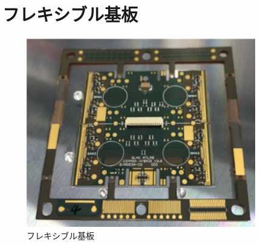\clearpage
\section{フレキシブル基板}
\begin{figure}[bpt]\centering
\includegraphics[width=10cm]{./pcb.png}
\caption[フレキシブル基板]{フレキシブル基板}
\label{pcb}
\end{figure}


